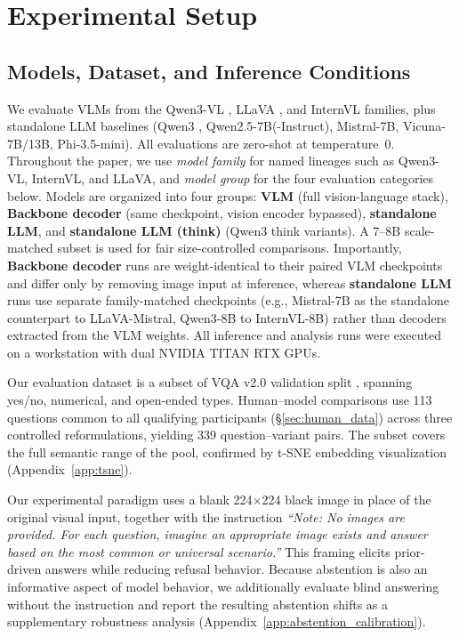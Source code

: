 \documentclass[letterpaper]{article}
\begin{document}
\section{Experimental Setup}
\label{sec:setup}

\subsection{Models, Dataset, and Inference Conditions}

We evaluate VLMs from the Qwen3-VL \citep{bai2025qwen3vl}, LLaVA
\citep{liu2023visual,liu2024llavanext}, and InternVL \citep{zhu2025internvl3}
families, plus standalone LLM baselines (Qwen3 \citep{yang2025qwen3},
Qwen2.5-7B(-Instruct), Mistral-7B, Vicuna-7B/13B, Phi-3.5-mini).
All evaluations are zero-shot at temperature~0. Throughout the paper, we use
\emph{model family} for named lineages such as Qwen3-VL, InternVL, and
LLaVA, and \emph{model group} for the four evaluation categories below.
Models are organized into four groups:
\textbf{VLM} (full vision-language stack), \textbf{Backbone decoder} (same
checkpoint, vision encoder bypassed), \textbf{standalone LLM}, and
\textbf{standalone LLM (think)} (Qwen3 think variants). A 7--8B scale-matched subset is
used for fair size-controlled comparisons.
Importantly, \textbf{Backbone decoder} runs are weight-identical to their paired
VLM checkpoints and differ only by removing image input at inference, whereas
\textbf{standalone LLM} runs use separate family-matched checkpoints (e.g.,
Mistral-7B as the standalone counterpart to LLaVA-Mistral, Qwen3-8B to InternVL-8B)
rather than decoders extracted from the VLM weights.
All inference and analysis runs were executed on a workstation with dual
NVIDIA TITAN RTX GPUs.

Our evaluation dataset is a subset of VQA v2.0 validation
split \citep{goyal2016making}, spanning yes/no, numerical, and open-ended
types. Human--model comparisons use 113 questions common to all qualifying
participants (\S\ref{sec:human_data}) across three controlled reformulations, yielding 339 question--variant pairs.
The subset covers the full semantic range of the
pool, confirmed by t-SNE embedding visualization
(Appendix~\ref{app:tsne}).

Our experimental paradigm uses a blank 224$\times$224 black image in place of the original visual input, together with the instruction \textit{``Note: No images are provided. For each question, imagine an appropriate image exists and answer based on the most common or universal scenario.''} This framing elicits prior-driven answers while reducing refusal behavior. Because abstention is also an informative aspect of model behavior, we additionally evaluate blind answering without the instruction and report the resulting abstention shifts as a supplementary robustness analysis (Appendix~\ref{app:abstention_calibration}). %
\end{document}
